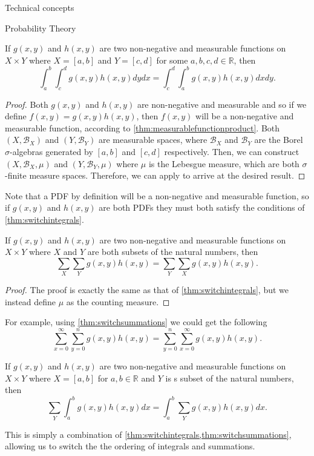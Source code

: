 \begin{section}{Technical concepts \label{sec:tc}}
\begin{subsection}{Probability Theory}
	\begin{corollary}
		\label{thm:switchintegrals}
		If $g(x,y)$ and $h(x,y)$ are two non-negative and measurable functions on $X \times Y$ where $X=[a,b]$ and $Y=[c,d]$ for some $a,b,c,d \in \mathbb{R}$, then
		\begin{equation*}
		\int_{a}^b \int_c^d g(x,y)h(x,y)dydx = \int_{c}^d \int_{a}^b g(x,y)h(x,y)dxdy.
		\end{equation*}
	\end{corollary}
\begin{proof}

	Both $g(x,y)$ and $h(x,y)$ are non-negative and measurable and so if we define $f(x,y) = g(x,y)h(x,y)$, then $f(x,y)$ will be a non-negative and measurable function, according to \cref{thm:measurablefunctionproduct}. Both $(X,\mathcal{B}_{X})$ and $(Y,\mathcal{B}_{Y})$ are measurable spaces, where $\mathcal{B}_{X}$ and $\mathcal{B}_{Y}$ are the Borel $\sigma$-algebras generated by $[a,b]$ and $[c,d]$ respectively. Then, we can construct $(X,\mathcal{B}_{X}, \mu)$ and $(Y,\mathcal{B}_{Y},\mu)$ where $\mu$ is the Lebesgue measure, which are both $\sigma$-finite measure spaces. Therefore, we can apply  to arrive at the desired result.
\end{proof}
	Note that a \ac{PDF} by definition will be a non-negative and measurable function, so if $g(x,y)$ and $h(x,y)$ are both \acp{PDF} they must both satisfy the conditions of \cref{thm:switchintegrals}.
\begin{corollary}
	\label{thm:switchsummations}
	If $g(x,y)$ and $h(x,y)$ are two non-negative and measurable functions on $X \times Y$ where $X$ and $Y$ are both subsets of the natural numbers, then
	\begin{equation*}
	\sum_{X} \sum_Y g(x,y)h(x,y) = \sum_{Y} \sum_{X} g(x,y)h(x,y).
	\end{equation*}
\end{corollary}
	\begin{proof}
	The proof is exactly the same as that of \cref{thm:switchintegrals}, but we instead define $\mu$ as the counting measure.
\end{proof}
For example, using \cref{thm:switchsummations} we could get the following
\begin{equation*}
\sum_{x=0}^\infty \sum_{y=0}^n g(x,y)h(x,y) = \sum_{y=0}^n \sum_{x=0}^\infty g(x,y)h(x,y).
\end{equation*}
\begin{corollary}
	\label{thm:switchsummationintegral}
If $g(x,y)$ and $h(x,y)$ are two non-negative and measurable functions on $X \times Y$ where $X = [a,b]$ for $a,b \in \mathbb{R}$ and $Y$ is s subset of the natural numbers, then
\begin{equation*}
\sum_{Y} \int_a^b g(x,y)h(x,y)dx = \int_{a}^b \sum_{Y} g(x,y)h(x,y)dx.
\end{equation*}
\end{corollary}
This  is simply a combination of \cref{thm:switchintegrals,thm:switchsummations}, allowing us to switch the the ordering of integrals and summations.


\end{subsection}
\end{section}
